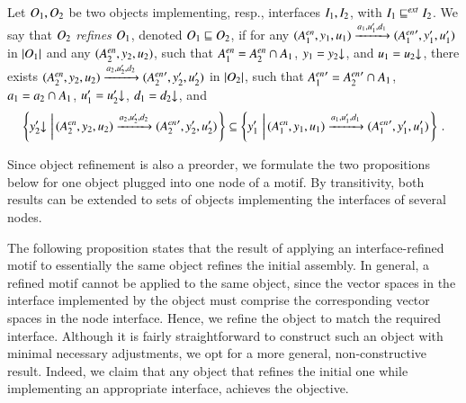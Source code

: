 \documentclass[runningheads]{llncs}
\makeatletter
\newcommand{\resp}[1][\@ ]{resp.{#1}}
\newcommand{\BRsetdef}[2]{\left\{#1\,\left|\,#2\right.\right\}}
\newcommand{\goesto}[2][]{\xrightarrow[#1]{#2}}
\newcommand{\abstracts}[1][]{\sqsubseteq\ifx#1\relax\else^{#1}\fi}
\newcommand{\isrefinedby}{\abstracts}
\newcommand{\interface}[1][]{I\ifx#1\relax\else^{#1}\fi}
\newcommand{\action}[1][]{a\ifx#1\relax\else^{#1}\fi}
\newcommand{\actions}[1][]{A\ifx\relax#1\relax\else^{#1}\fi}
\newcommand{\measure}[1][]{y\ifx#1\relax\else^{#1}\fi}
\newcommand{\measurerange}[1][]{Y\ifx#1\relax\else^{#1}\fi}
\newcommand{\knob}[1][]{u\ifx#1\relax\else^{#1}\fi}
\newcommand{\knobrange}[1][]{U\ifx#1\relax\else^{#1}\fi}
\newcommand{\disturbance}[1][]{d\ifx#1\relax\else^{#1}\fi}
\newcommand{\disturbancerange}[1][]{D\ifx#1\relax\else^{#1}\fi}
\newcommand{\project}[3][]{{#2}{\downarrow}\ifx#1\relax\else_{#3}\fi}
\newcommand{\object}[1][]{O\ifx#1\relax\else^{#1}\fi}
\newcommand{\semantics}[1]{|#1|}
\newcommand{\vectorspace}[1][]{S\ifx#1\relax\else^{#1}\fi}
\newcommand{\external}[2][]{\ifx\relax#2\relax#1\mathit{ext}\else#2[#1\mathit{ext}]\fi}
\newcommand{\enabled}[2][]{{#2[\mathit{en}]\ifx#1\relax\else_{#1}\fi}}
\makeatother
\begin{document}
\begin{definition}
  \label{defn:open:simulation}
  Let $\object_1, \object_2$ be two objects implementing, \resp[,] interfaces $\interface_1, \interface_2$, with $\interface_1 \external\isrefinedby \interface_2$.  We say that $\object_2$ \emph{refines} $\object_1$, denoted $\object_1 \isrefinedby \object_2$, if for any 
  $
  (
  \enabled[1]{\actions}
  , \measure_1
  , \knob_1
  ) 
  \goesto{\action_1, \knob_1', \disturbance_1} 
  (
  \enabled[1]{\actions}'
  , \measure_1'
  , \knob_1'
  )
  $
  in $\semantics{\object_1}$ and any
  $
  (
  \enabled[2]{\actions}
  , \measure_2
  , \knob_2
  )
  $, such that
  $
  \enabled[1]{\actions} = 
  \enabled[2]{\actions} \cap \actions_1
  $,
  $\measure_1 = \project{\measure_2}{\vectorspace{\measurerange_{1}}}$,
  and
  $\knob_1 = \project{\knob_2}{\vectorspace{\knobrange_{1}}}$,
  there exists
  $
  (
  \enabled[2]{\actions}
  , \measure_2
  , \knob_2
  ) 
  \goesto{\action_2, \knob_2', \disturbance_2} 
  (
  \enabled[2]{\actions}'
  , \measure_2'
  , \knob_2'
  )
  $
  in $\semantics{\object_2}$, such that
  $
  \enabled[1]{\actions}' = 
  \enabled[2]{\actions}' \cap \actions_1
  $,
  $\action_1 = \action_2 \cap \actions_1$,
  $\knob_1' = \project{\knob_2'}{\vectorspace{\knobrange_{1}}}$,
  $\disturbance_1 = \project{\disturbance_2}{\vectorspace{\disturbancerange_{1}}}$,
  and
  \[
  \BRsetdef{\project{\measure_2'}{\vectorspace{\measurerange_{1}}}}{
    (
    \enabled[2]{\actions}
    , \measure_2
    , \knob_2
    ) 
    \goesto{\action_2, \knob_2', \disturbance_2} 
    (
    \enabled[2]{\actions}'
    , \measure_2'
    , \knob_2'
    )
  }
  \subseteq
  \BRsetdef{\measure_1'}{
    (
    \enabled[1]{\actions}
    , \measure_1
    , \knob_1
    ) 
    \goesto{\action_1, \knob_1', \disturbance_1} 
    (
    \enabled[1]{\actions}'
    , \measure_1'
    , \knob_1'
    )
  }
  \,.
  \]
\end{definition}

Since object refinement is also a preorder, we formulate the two propositions below for one object plugged into one node of a motif.  By transitivity, both results can be extended to sets of objects implementing the interfaces of several nodes.

The following proposition states that the result of applying an interface-refined motif to essentially the same object refines the initial assembly.  In general, a refined motif cannot be applied to the same object, since the vector spaces in the interface implemented by the object must comprise the corresponding vector spaces in the node interface.  Hence, we refine the object to match the required interface.  Although it is fairly straightforward to construct such an object with minimal necessary adjustments, we opt for a more general, non-constructive result.  Indeed, we claim that any object that refines the initial one while implementing an appropriate interface, achieves the objective.
\end{document}
